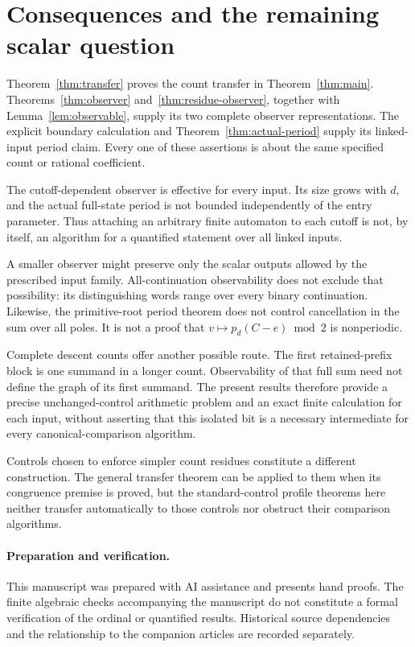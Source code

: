 \documentclass[11pt,a4paper]{article}
\theoremstyle{definition}
\numberwithin{equation}{section}
\begin{document}








\section{Consequences and the remaining scalar question}

Theorem~\ref{thm:transfer} proves the count transfer in
Theorem~\ref{thm:main}. Theorems~\ref{thm:observer}
and~\ref{thm:residue-observer}, together with
Lemma~\ref{lem:observable}, supply its two complete observer
representations. The explicit boundary calculation and
Theorem~\ref{thm:actual-period} supply its linked-input period claim.
Every one of these assertions is about the same specified count or
rational coefficient.

The cutoff-dependent observer is effective for every input. Its size
grows with $d$, and the actual full-state period is not bounded
independently of the entry parameter. Thus attaching an arbitrary
finite automaton to each cutoff is not, by itself, an algorithm for a
quantified statement over all linked inputs.

A smaller observer might preserve only the scalar outputs allowed by
the prescribed input family. All-continuation observability does not
exclude that possibility: its distinguishing words range over every
binary continuation. Likewise, the primitive-root period theorem
does not control cancellation in the sum over all poles. It is not a
proof that $v\mapsto p_d(C-e)\bmod2$ is nonperiodic.

Complete descent counts offer another possible route. The first
retained-prefix block is one summand in a longer count. Observability
of that full sum need not define the graph of its first summand.
The present results therefore provide a precise unchanged-control
arithmetic problem and an exact finite calculation for each input,
without asserting that this isolated bit is a necessary intermediate
for every canonical-comparison algorithm.

Controls chosen to enforce simpler count residues constitute a different
construction. The general transfer theorem can be applied to them when
its congruence premise is proved, but the standard-control profile
theorems here neither transfer automatically to those controls nor
obstruct their comparison algorithms.

\paragraph{Preparation and verification.}
This manuscript was prepared with AI assistance and presents hand
proofs. The finite algebraic checks accompanying the manuscript do not
constitute a formal verification of the ordinal or quantified results.
Historical source dependencies and the relationship to the companion
articles are recorded separately.



\end{document}
